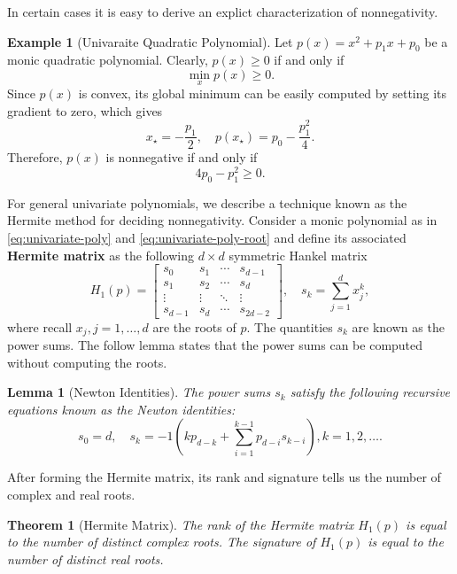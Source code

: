 \documentclass[
]{book}
\newtheorem{theorem}{Theorem}[chapter]
\newtheorem{lemma}{Lemma}[chapter]
\theoremstyle{definition}
\theoremstyle{definition}
\newtheorem{example}{Example}[chapter]
\theoremstyle{definition}
\theoremstyle{definition}
\theoremstyle{remark}
\begin{document}
In certain cases it is easy to derive an explict characterization of nonnegativity.

\begin{example}[Univaraite Quadratic Polynomial]
\protect\hypertarget{exm:NonnegativeQuadratic}{}\label{exm:NonnegativeQuadratic}Let \(p(x) = x^2 + p_1 x + p_0\) be a monic quadratic polynomial. Clearly, \(p(x) \geq 0\) if and only if
\[
\min_{x} p(x) \geq 0.
\]
Since \(p(x)\) is convex, its global minimum can be easily computed by setting its gradient to zero, which gives
\[
x_\star = - \frac{p_1}{2}, \quad p(x_\star) = p_0 - \frac{p_1^2}{4}.
\]
Therefore, \(p(x)\) is nonnegative if and only if
\[
4 p_0 - p_1^2 \geq 0.
\]
\end{example}

For general univariate polynomials, we describe a technique known as the Hermite method for deciding nonnegativity. Consider a monic polynomial as in \eqref{eq:univariate-poly} and \eqref{eq:univariate-poly-root} and define its associated \textbf{Hermite matrix} as the following \(d \times d\) symmetric Hankel matrix
\[
H_1(p) = \begin{bmatrix}
s_0 & s_1 & \cdots & s_{d-1} \\
s_1 & s_2 & \cdots & s_d \\
\vdots & \vdots & \ddots & \vdots \\
s_{d-1} & s_d & \cdots & s_{2d-2}
\end{bmatrix}, \quad s_k = \sum_{j=1}^d x_j^k,
\]
where recall \(x_j,j=1,\dots,d\) are the roots of \(p\). The quantities \(s_k\) are known as the power sums. The follow lemma states that the power sums can be computed without computing the roots.

\begin{lemma}[Newton Identities]
\protect\hypertarget{lem:NewtonIdentity}{}\label{lem:NewtonIdentity}The power sums \(s_k\) satisfy the following recursive equations known as the Newton identities:
\[
s_0 = d, \quad s_k = -1\left(k p_{d-k} + \sum_{i=1}^{k-1} p_{d-i} s_{k-i} \right), k=1,2,\dots.
\]
\end{lemma}

After forming the Hermite matrix, its rank and signature tells us the number of complex and real roots.

\begin{theorem}[Hermite Matrix]
\protect\hypertarget{thm:HermiteMatrix}{}\label{thm:HermiteMatrix}The rank of the Hermite matrix \(H_1(p)\) is equal to the number of distinct complex roots. The signature of \(H_1(p)\) is equal to the number of distinct real roots.
\end{theorem}
\end{document}
